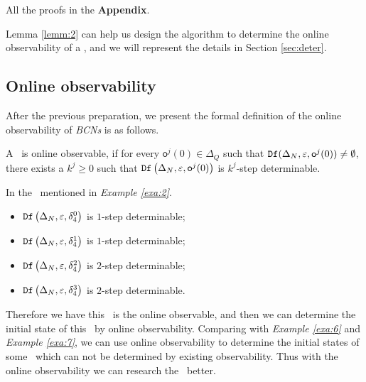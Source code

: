 All the proofs in the {\bf Appendix}. 

Lemma \ref{lemm:2} can help us design the algorithm to determine the online observability of a \BCN, and we will represent the details in   Section \ref{sec:deter}.

\subsection{Online observability}
After the previous preparation, we present the formal definition of the online observability of {\em BCNs} is as follows.

\begin{definition}
 A \BCN\ is online observable,
if for every $\mathsf{o}^{j}(0)\in \Delta_Q$ such that ${\tt Df}(\Delta_N,\varepsilon, \mathsf{o}^{j}(0))\ne \emptyset$, there exists a $k^{j}\ge0$ such that ${\tt Df}\left(\Delta_N,\varepsilon,\mathsf{o}^{j}(0)\right)$ is $k^{j}$-step determinable.
\end{definition}


\begin{example}
In the \BCN\ mentioned in {\em Example \ref{exa:2}}.  
 \begin{itemize}
 \item ${\tt Df}\left(\Delta_N,\varepsilon, \delta_{4}^0\right)$ is $1$-step determinable;
 \item ${\tt Df}\left(\Delta_N,\varepsilon, \delta_{4}^1\right)$ is $1$-step determinable;
 \item ${\tt Df}\left(\Delta_N,\varepsilon, \delta_{4}^2\right)$ is $2$-step determinable;
 \item ${\tt Df}\left(\Delta_N,\varepsilon, \delta_{4}^3\right)$ is $2$-step determinable.
 \end{itemize}
 
Therefore we have this \BCN\ is the online observable, and then we can determine the initial state of this \BCN\ by online observability. Comparing with {\em Example \ref{exa:6}} and {\em Example \ref{exa:7}}, we can use online observability to determine the initial states of some \BCNs\ which can not be determined by existing observability. Thus with the online observability we can research the \BCNs\ better.
\label{exa:10}
\end{example}  

